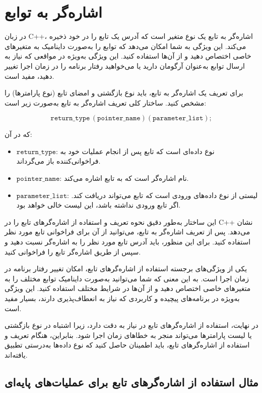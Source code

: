 \documentclass[12pt, a4paper]{report}
\begin{document}
\section{اشاره‌گر به توابع}


در زبان C++، اشاره‌گر به تابع یک نوع متغیر است که آدرس یک تابع را در خود ذخیره می‌کند. این ویژگی به شما امکان می‌دهد که توابع را به‌صورت داینامیک به متغیرهای خاصی اختصاص دهید و از آن‌ها استفاده کنید. این ویژگی به‌ویژه در مواقعی که نیاز به ارسال توابع به‌عنوان آرگومان دارید یا می‌خواهید رفتار برنامه را در زمان اجرا تغییر دهید، مفید است.

برای تعریف یک اشاره‌گر به تابع، باید نوع بازگشتی و امضای تابع (نوع پارامترها) را مشخص کنید. ساختار کلی تعریف اشاره‌گر به تابع به‌صورت زیر است:

\[
\texttt{return\_type} \, (\texttt{pointer\_name})(\texttt{parameter\_list});
\]

که در آن:
\begin{itemize}
	\item \(\texttt{return\_type}\): نوع داده‌ای است که تابع پس از انجام عملیات خود به فراخوانی‌کننده باز می‌گرداند.
	\item \(\texttt{pointer\_name}\): نام اشاره‌گر است که به تابع اشاره می‌کند.
	\item \(\texttt{parameter\_list}\): لیستی از نوع داده‌های ورودی است که تابع می‌تواند دریافت کند. اگر تابع ورودی نداشته باشد، این لیست خالی خواهد بود.
\end{itemize}

این ساختار به‌طور دقیق نحوه تعریف و استفاده از اشاره‌گرهای تابع را در C++ نشان می‌دهد. پس از تعریف اشاره‌گر به تابع، می‌توانید از آن برای فراخوانی تابع مورد نظر استفاده کنید. برای این منظور، باید آدرس تابع مورد نظر را به اشاره‌گر نسبت دهید و سپس از طریق اشاره‌گر تابع را فراخوانی کنید.

یکی از ویژگی‌های برجسته استفاده از اشاره‌گرهای تابع، امکان تغییر رفتار برنامه در زمان اجرا است. به این معنی که شما می‌توانید به‌صورت داینامیک توابع مختلف را به متغیرهای خاصی اختصاص دهید و از آن‌ها در شرایط مختلف استفاده کنید. این ویژگی به‌ویژه در برنامه‌های پیچیده و کاربردی که نیاز به انعطاف‌پذیری دارند، بسیار مفید است.

در نهایت، استفاده از اشاره‌گرهای تابع در  نیاز به دقت دارد، زیرا اشتباه در نوع بازگشتی یا لیست پارامترها می‌تواند منجر به خطاهای زمان اجرا شود. بنابراین، هنگام تعریف و استفاده از اشاره‌گرهای تابع، باید اطمینان حاصل کنید که نوع داده‌ها به‌درستی تطبیق یافته‌اند.


\subsection{مثال استفاده از اشاره‌گرهای تابع برای عملیات‌های پایه‌ای}
\end{document}
